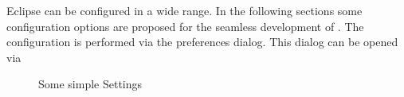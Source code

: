 Eclipse can be configured in a wide range. In the following sections
some configuration options are proposed for the seamless development
of \ExTeX. The configuration is performed via the preferences dialog.
This dialog can be opened via 
\begin{figure}[htp]
  \hbox{}\hfill
  \hfill
  \caption{Some simple Settings}
\end{figure}

